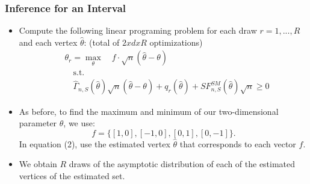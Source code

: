 \documentclass[10pt,letterpaper]{beamer}
\begin{document}

\begin{frame}
\frametitle{Inference for an Interval}

\begin{itemize}
\item Compute the following linear programing problem for each draw $%
r=1,...,R$ and each vertex $\hat{\theta}$: (total of $2xdxR$ optimizations)  
\begin{equation}
\begin{split}
& \theta _{r}=\max_{\theta }\quad f\cdot \sqrt{n}(\hat{\theta}-\theta ) \\
& \quad \text{s.t.} \\
& \quad \widehat{\Gamma }_{n,S}(\hat{\theta})\sqrt{n}(\hat{\theta}-\theta
)+q_{r}(\hat{\theta})+SF_{n,S}^{SM}(\hat{\theta})\sqrt{n}\geq 0
\end{split}%
\end{equation}

\item As before, to find the maximum and minimum of our
two-dimensional parameter $\theta$, we use:  
\begin{equation*}
f=\{[1,0],[-1,0],[0,1],[0,-1]\}.
\end{equation*}
In equation (2), use the estimated
vertex $\hat{\theta}$ that corresponds to each vector $f$. 

\item We obtain $R$ draws of the asymptotic distribution of each of the
estimated vertices of the estimated set.
\end{itemize}
\end{frame}

\end{document}
